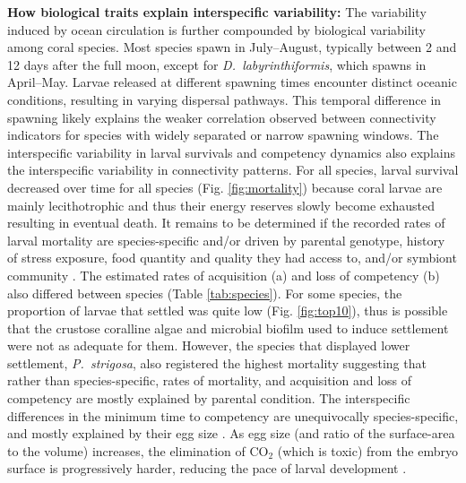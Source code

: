 \documentclass[preprint,12pt,authoryear]{elsarticle}
\begin{document}
	\textbf{How biological traits explain interspecific variability:} The variability induced by ocean circulation is further compounded by biological variability among coral species. Most species spawn in July–August, typically between 2 and 12 days after the full moon, except for \textit{D.~labyrinthiformis}, which spawns in April–May. Larvae released at different spawning times encounter distinct oceanic conditions, resulting in varying dispersal pathways. This temporal difference in spawning likely explains the weaker correlation observed between connectivity indicators for species with widely separated or narrow spawning windows. The interspecific variability in larval survivals and competency dynamics also explains the interspecific variability in connectivity patterns. For all species, larval survival decreased over time for all species (Fig. \ref{fig:mortality}) because coral larvae are mainly lecithotrophic and thus their energy reserves slowly become exhausted resulting in eventual death. It remains to be determined if the recorded rates of larval mortality are species-specific and/or driven by parental genotype, history of stress exposure, food quantity and quality they had access to, and/or symbiont community \citep{jones2011tradeoffs, baums2013genotypic, padilla2013all, kirk2018genomic}. The estimated rates of acquisition (a) and loss of competency (b) also differed between species (Table \ref{tab:species}). For some species, the proportion of larvae that settled was quite low (Fig. \ref{fig:top10}), thus is possible that the crustose coralline algae and microbial biofilm used to induce settlement were not as adequate for them. However, the species that displayed lower settlement, \textit{P.~strigosa}, also registered the highest mortality suggesting that rather than species-specific, rates of mortality, and acquisition and loss of competency are mostly explained by parental condition. The interspecific differences in the minimum time to competency are unequivocally species-specific, and mostly explained by their egg size \citep{figueiredo2013synthesizing}. As egg size (and ratio of the surface-area to the volume) increases, the elimination of CO$_2$ (which is toxic) from the embryo surface is progressively harder, reducing the pace of larval development \citep{berrill1935cell, einum2002egg}.
	
\end{document}
